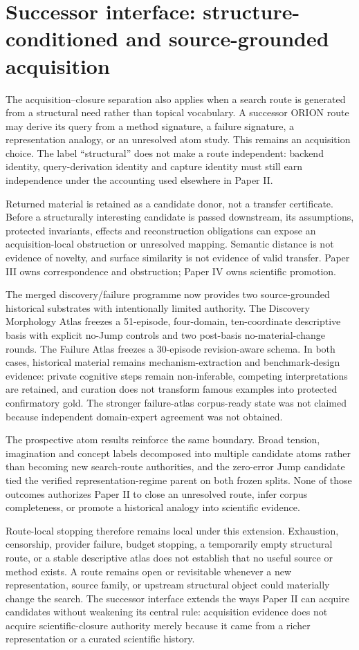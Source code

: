 \section{Successor interface: structure-conditioned and source-grounded acquisition}
\label{sec:p2-structure-conditioned-interface}

The acquisition--closure separation also applies when a search route is generated from a structural need rather than topical vocabulary. A successor ORION route may derive its query from a method signature, a failure signature, a representation analogy, or an unresolved atom study. This remains an acquisition choice. The label ``structural'' does not make a route independent: backend identity, query-derivation identity and capture identity must still earn independence under the accounting used elsewhere in Paper II.

Returned material is retained as a candidate donor, not a transfer certificate. Before a structurally interesting candidate is passed downstream, its assumptions, protected invariants, effects and reconstruction obligations can expose an acquisition-local obstruction or unresolved mapping. Semantic distance is not evidence of novelty, and surface similarity is not evidence of valid transfer. Paper III owns correspondence and obstruction; Paper IV owns scientific promotion.

The merged discovery/failure programme now provides two source-grounded historical substrates with intentionally limited authority. The Discovery Morphology Atlas freezes a 51-episode, four-domain, ten-coordinate descriptive basis with explicit no-Jump controls and two post-basis no-material-change rounds. The Failure Atlas freezes a 30-episode revision-aware schema. In both cases, historical material remains mechanism-extraction and benchmark-design evidence: private cognitive steps remain non-inferable, competing interpretations are retained, and curation does not transform famous examples into protected confirmatory gold. The stronger failure-atlas corpus-ready state was not claimed because independent domain-expert agreement was not obtained.

The prospective atom results reinforce the same boundary. Broad tension, imagination and concept labels decomposed into multiple candidate atoms rather than becoming new search-route authorities, and the zero-error Jump candidate tied the verified representation-regime parent on both frozen splits. None of those outcomes authorizes Paper II to close an unresolved route, infer corpus completeness, or promote a historical analogy into scientific evidence.

Route-local stopping therefore remains local under this extension. Exhaustion, censorship, provider failure, budget stopping, a temporarily empty structural route, or a stable descriptive atlas does not establish that no useful source or method exists. A route remains open or revisitable whenever a new representation, source family, or upstream structural object could materially change the search. The successor interface extends the ways Paper II can acquire candidates without weakening its central rule: acquisition evidence does not acquire scientific-closure authority merely because it came from a richer representation or a curated scientific history.
